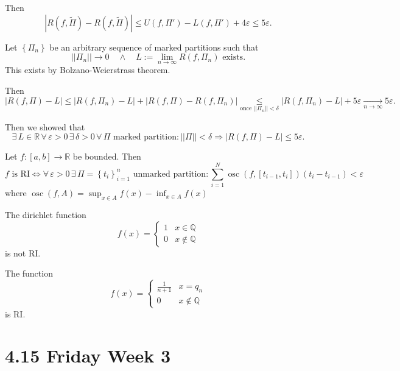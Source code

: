 \documentclass{notes}
\begin{document}
\begin{prf}
  Then 
  \[
    \left | R(f, \tilde \Pi) - R(f, \tilde \Pi) \right | \leq U(f, \Pi') - L(f, \Pi') + 4 \varepsilon \leq 5 \varepsilon.
  \]
  
  Let $\left \{ \Pi_n \right \}$ be an arbitrary sequence of marked partitions such that 
  \[
    ||\Pi_n|| \to 0 \quad \land \quad L := \lim_{n \to \infty} R(f, \Pi_n) \text{ exists}.
  \]
  This exists by Bolzano-Weierstrass theorem.
  
  Then 
  \[
    \left | R(f, \Pi) - L \right | \leq \left | R(f, \Pi_n) - L \right | + \left | R(f, \Pi) - R(f, \Pi_n) \right | \underset{\text{once } ||\Pi_n|| < \delta}{\leq} \left | R(f, \Pi_n) - L \right | + 5 \varepsilon \underset{n \to \infty}{\longrightarrow} 5 \varepsilon.
  \]
  
  Then we showed that 
  \[
    \exists \, L \in \mathbb R \, \forall \, \varepsilon > 0 \, \exists \, \delta > 0 \, \forall \, \Pi \text{ marked partition}: ||\Pi|| < \delta \Rightarrow \left | R(f, \Pi) - L \right | \leq 5 \varepsilon.
  \]
\end{prf}

\begin{cor}
  Let $f \colon [a, b] \to \mathbb R$ be bounded.
  Then 
  \[
    \text{$f$ is RI} \Leftrightarrow \forall \, \varepsilon > 0 \, \exists \, \Pi = \left \{ t_i \right \}_{i = 1}^n \text{ unmarked partition}: \sum_{i = 1}^N \operatorname{osc}(f, [t_{i - 1}, t_i])(t_i - t_{i - 1}) < \varepsilon
  \]
  where $\operatorname{osc}(f, A) = \sup_{x \in A} f(x) - \inf_{x \in A} f(x)$
\end{cor}

\newpage

\begin{eg}
  The dirichlet function 
  \[
    f(x) = \begin{cases}
      1 & x \in \mathbb Q \\ 
      0 & x \not \in \mathbb Q
    \end{cases}
  \]
  is not RI.
\end{eg}

\begin{eg}
  The function 
  \[
    f(x) = \begin{cases}
      \frac{1}{n + 1} & x = q_n \\ 
      0 & x \not \in \mathbb Q
    \end{cases}
  \]
  is RI.
\end{eg}

\newpage

\section{4.15 Friday Week 3}
\end{document}
